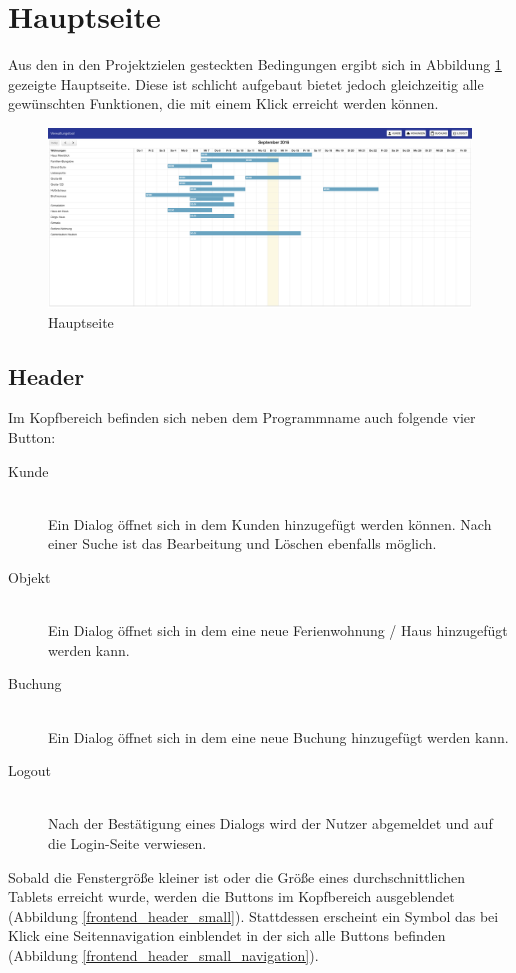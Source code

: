 \section{Hauptseite}
Aus den in den Projektzielen gesteckten Bedingungen ergibt sich in Abbildung \ref{frontend_mainpage} gezeigte Hauptseite.
Diese ist schlicht aufgebaut bietet jedoch gleichzeitig alle gewünschten Funktionen, die mit einem Klick erreicht werden können.

\begin{figure}[H]
\centering\includegraphics[width=1\textwidth]{images/frontend_mainpage.png}
\caption{Hauptseite}
\label{frontend_mainpage}
\end{figure}

\subsection{Header}
Im Kopfbereich befinden sich neben dem Programmname auch folgende vier Button:

\begin{description}
\item[Kunde]\hfill \\
Ein Dialog öffnet sich in dem Kunden hinzugefügt werden können. Nach einer Suche ist das Bearbeitung und Löschen ebenfalls möglich.
\item[Objekt]\hfill \\ 
Ein Dialog öffnet sich in dem eine neue Ferienwohnung / Haus hinzugefügt werden kann. 
\item[Buchung]\hfill \\ 
Ein Dialog öffnet sich in dem eine neue Buchung hinzugefügt werden kann. 
\item[Logout]\hfill \\ 
Nach der Bestätigung eines Dialogs wird der Nutzer abgemeldet und auf die Login-Seite verwiesen. 
\end{description}

Sobald die Fenstergröße kleiner ist oder die Größe eines durchschnittlichen Tablets erreicht wurde, werden die Buttons im Kopfbereich ausgeblendet
(Abbildung \ref{frontend_header_small}). Stattdessen erscheint ein Symbol das bei Klick eine Seitennavigation einblendet in der sich alle Buttons befinden
 (Abbildung \ref{frontend_header_small_navigation}).

